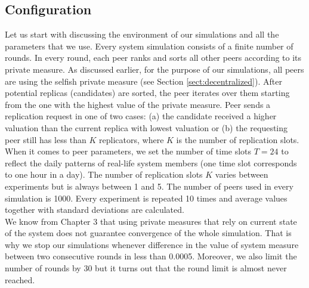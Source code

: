 \documentclass{pracamgren}
\begin{document}
\subsection{Configuration}\label{sect:configuration}

Let us start with discussing the environment of our simulations and all the parameters that we use. Every system simulation consists of a finite number of rounds. In every round, each peer ranks and sorts all other peers according to its private measure. As discussed earlier, for the purpose of our simulations, all peers are using the selfish private measure (see Section \ref{sect:decentralized}). After potential replicas (candidates) are sorted, the peer iterates over them starting from the one with the highest value of the private measure. Peer sends a replication request in one of two cases: (a) the candidate received a higher valuation than the current replica with lowest valuation or (b) the requesting peer still has less than $K$ replicators, where $K$ is the number of replication slots.\\

When it comes to peer parameters, we set the number of time slots $T=24$ to reflect the daily patterns of real-life system members (one time slot corresponds to one hour in a day). The number of replication slots $K$ varies between experiments but is always between 1 and 5. The number of peers used in every simulation is 1000. Every experiment is repeated 10 times and average values together with standard deviations are calculated.\\

We know from Chapter 3 that using private measures that rely on current state of the system does not guarantee convergence of the whole simulation. That is why we stop our simulations whenever difference in the value of system measure between two consecutive rounds in less than 0.0005. Moreover, we also limit the number of rounds by 30 but it turns out that the round limit is almost never reached.\\
\end{document}
